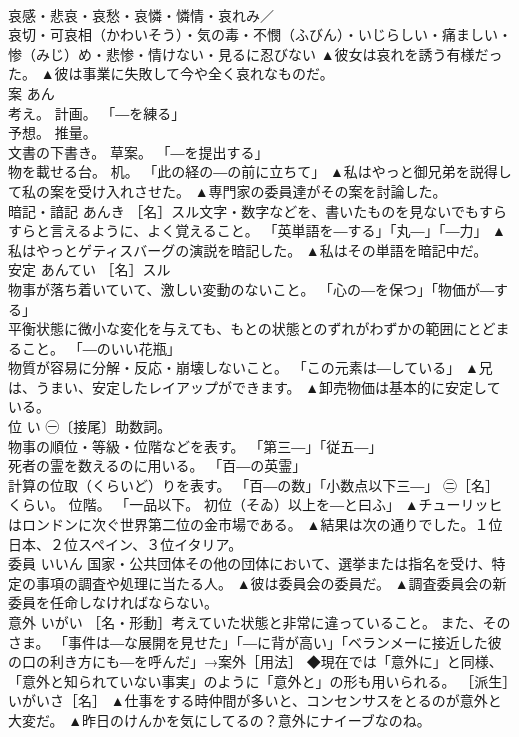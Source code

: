 \documentclass[8pt]{extreport}
\begin{document}
\begin{CJK}{UTF8}{min}
\\	哀感・悲哀・哀愁・哀憐・憐情・哀れみ／ 
\\	哀切・可哀相（かわいそう）・気の毒・不憫（ふびん）・いじらしい・痛ましい・惨（みじ）め・悲惨・情けない・見るに忍びない	▲彼女は哀れを誘う有様だった。 ▲彼は事業に失敗して今や全く哀れなものだ。
\\	案	あん	
\\	考え。 計画。 「―を練る」 
\\	予想。 推量。 
\\	文書の下書き。 草案。 「―を提出する」 
\\	物を載せる台。 机。 「此の経の―の前に立ちて」	▲私はやっと御兄弟を説得して私の案を受け入れさせた。 ▲専門家の委員達がその案を討論した。
\\	暗記・諳記	あんき	［名］スル文字・数字などを、書いたものを見ないでもすらすらと言えるように、よく覚えること。 「英単語を―する」「丸―」「―力」	▲私はやっとゲティスバーグの演説を暗記した。 ▲私はその単語を暗記中だ。
\\	安定	あんてい	［名］スル 
\\	物事が落ち着いていて、激しい変動のないこと。 「心の―を保つ」「物価が―する」 
\\	平衡状態に微小な変化を与えても、もとの状態とのずれがわずかの範囲にとどまること。 「―のいい花瓶」 
\\	物質が容易に分解・反応・崩壊しないこと。 「この元素は―している」	▲兄は、うまい、安定したレイアップができます。 ▲卸売物価は基本的に安定している。
\\	位	い	㊀〔接尾〕助数詞。 
\\	物事の順位・等級・位階などを表す。 「第三―」「従五―」 
\\	死者の霊を数えるのに用いる。 「百―の英霊」 
\\	計算の位取（くらいど）りを表す。 「百―の数」「小数点以下三―」 ㊁［名］くらい。 位階。 「一品以下。 初位（そゐ）以上を―と曰ふ」	▲チューリッヒはロンドンに次ぐ世界第二位の金市場である。 ▲結果は次の通りでした。１位日本、２位スペイン、３位イタリア。
\\	委員	いいん	国家・公共団体その他の団体において、選挙または指名を受け、特定の事項の調査や処理に当たる人。	▲彼は委員会の委員だ。 ▲調査委員会の新委員を任命しなければならない。
\\	意外	いがい	［名・形動］考えていた状態と非常に違っていること。 また、そのさま。 「事件は―な展開を見せた」「―に背が高い」「ベランメーに接近した彼の口の利き方にも―を呼んだ」→案外［用法］ ◆現在では「意外に」と同様、「意外と知られていない事実」のように「意外と」の形も用いられる。 ［派生］いがいさ［名］	▲仕事をする時仲間が多いと、コンセンサスをとるのが意外と大変だ。 ▲昨日のけんかを気にしてるの？意外にナイーブなのね。

\end{CJK}
\end{document}
